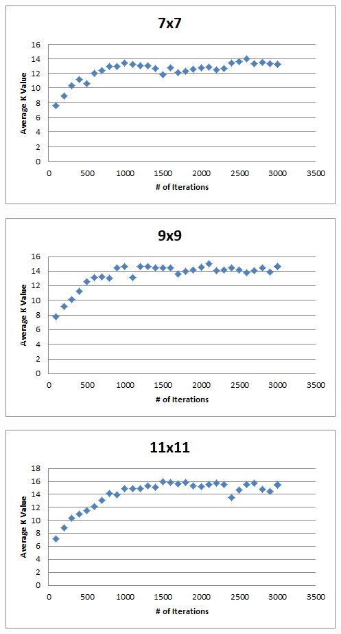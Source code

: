 \documentclass[12pt, letterpaper]{article}
\begin{document}
\bigskip

\includegraphics[width=\linewidth]{"Task 5/7x7 Scatterplot"}

\bigskip

\includegraphics[width=\linewidth]{"Task 5/9x9 Scatterplot"}

\bigskip

\includegraphics[width=\linewidth]{"Task 5/11x11 Scatterplot"}
\end{document}
